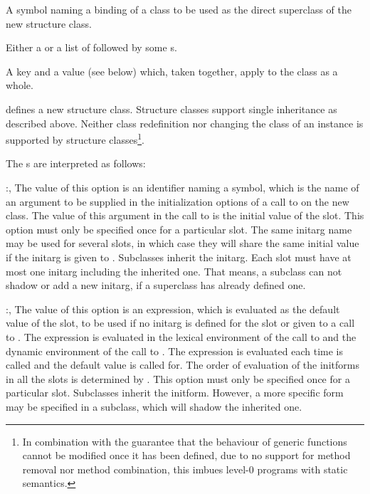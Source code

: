 \begin{optDefinition}
\begin{arguments}
    \item[\scref{superclass-name}] A symbol naming a binding of a class to be
    used as the direct superclass of the new structure class.

    \item[\scref{slot}] Either a  or a list of
     followed by some s.

    \item[\scref{class-option}] A key and a value (see below) which, taken
    together, apply to the class as a whole.
\end{arguments}
%
\remarks%
 defines a new structure class. Structure classes support
single inheritance as described above. Neither class redefinition nor changing
the class of an instance is supported by structure classes\footnote{In
    combination with the guarantee that the behaviour of generic functions
    cannot be modified once it has been defined, due to no support for method
    removal nor method combination, this imbues level-0 programs with static
    semantics.}.

The s are interpreted as follows:
\begin{options}
    \item[\keyworddef{keyword}:, \scref{identifier}]%
    The value of this option is an identifier naming a symbol, which is the name
    of an argument to be supplied in the initialization options of a call to
     on the new class.  The value of this argument in the call
    to  is the initial value of the slot.  This option must
    only be specified once for a particular slot.  The same initarg name may be
    used for several slots, in which case they will share the same initial value
    if the initarg is given to .  Subclasses inherit the
    initarg. Each slot must have at most one initarg including the inherited
    one. That means, a subclass can not shadow or add a new initarg, if a
    superclass has already defined one.

    \item[\keyworddef{default}:, \scref{level-0-expression}]%
    The value of this option is an expression, which is evaluated as the default
    value of the slot, to be used if no initarg is defined for the slot or given
    to a call to .  The expression is evaluated in the lexical
    environment of the call to  and the dynamic environment
    of the call to .  The expression is evaluated each time
     is called and the default value is called for.  The order
    of evaluation of the initforms in all the slots is determined by
    .  This option must only be specified once for a
    particular slot. Subclasses inherit the initform.  However, a more specific
    form may be specified in a subclass, which will shadow the inherited one.


\end{options}
\end{optDefinition}
